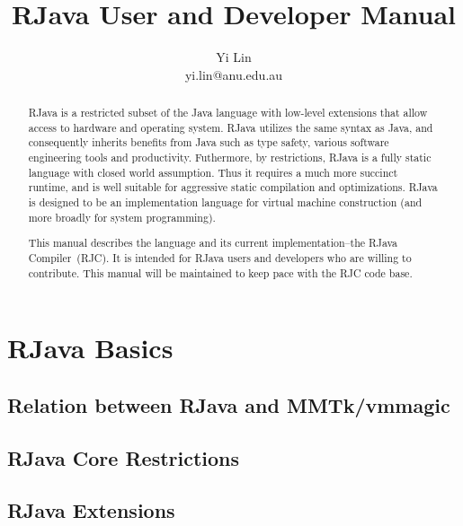 \documentclass[12pt]{article}
\title{RJava User and Developer Manual}
\author{Yi Lin\\yi.lin@anu.edu.au}
\begin{document}
\newcommand{\rjc}{RJC\xspace}
\newcommand{\rjcfull}{RJava Compiler\xspace}
\maketitle

\begin{abstract}
RJava is a restricted subset of the Java language 
with low-level extensions
that allow access to hardware and operating system. 
RJava utilizes the same syntax as Java, and consequently
inherits benefits from Java such as type safety, 
various software engineering tools and productivity. Futhermore, 
by restrictions, RJava is a fully static language with closed world
assumption. Thus it requires a much more succinct runtime, and
is well suitable for aggressive static compilation and optimizations. 
RJava is designed to be an implementation language for virtual machine
construction (and more broadly for system programming). 

This manual describes the language and its 
current implementation--the \rjcfull~(\rjc). It is intended for RJava users
and developers who are willing to contribute. This manual will be
maintained to keep pace with the \rjc code base. 
\end{abstract}
\clearpage

\setcounter{secnumdepth}{5}
\setcounter{tocdepth}{5}
\tableofcontents 
\clearpage


\section{RJava Basics}

\subsection{Relation between RJava and MMTk/vmmagic}

\subsection{RJava Core Restrictions}

\subsection{RJava Extensions}

\end{document}

